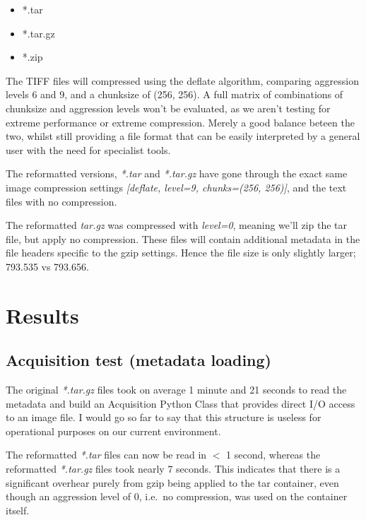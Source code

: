 \documentclass[a4paper]{article}
\begin{document}
    \begin{itemize}
      \item *.tar
      \item *.tar.gz
      \item *.zip
    \end{itemize}

    \begin{flushleft}
    The TIFF files will compressed using the deflate algorithm, comparing aggression levels 6 and 9, and a chunksize of (256, 256). A full matrix of combinations of chunksize and aggression levels won't be evaluated, as we aren't testing for extreme performance or extreme compression. Merely a good balance beteen the two, whilst still providing a file format that can be easily interpreted by a general user with the need for specialist tools. \par
    The reformatted versions, \textit{*.tar} and \textit{*.tar.gz} have gone through the exact same image compression settings \textit{[deflate, level=9, chunks=(256, 256)]}, and the text files with no compression. \par
    The reformatted \textit{tar.gz} was compressed with \textit{level=0}, meaning we’ll zip the tar file, but apply no compression. These files will contain additional metadata in the file headers specific to the gzip settings.  Hence the file size is only slightly larger; 793.535 vs 793.656.
    \end{flushleft}

  \section{Results}

  \subsection{Acquisition test (metadata loading)}

    \begin{flushleft}
    The original \textit{*.tar.gz} files took on average 1 minute and 21 seconds to read the metadata and build an Acquisition Python Class that provides direct I/O access to an image file. I would go so far to say that this structure is useless for operational purposes on our current environment. \par
    The reformatted \textit{*.tar} files can now be read in $<$ 1 second, whereas the reformatted \textit{*.tar.gz} files took nearly 7 seconds. This indicates that there is a significant overhear purely from gzip being applied to the tar container, even though an aggression level of 0, i.e.\ no compression, was used on the container itself. \par
    \end{flushleft}
\end{document}
